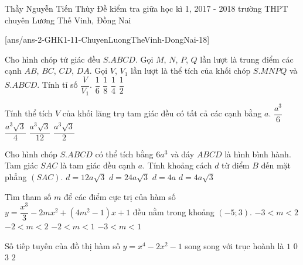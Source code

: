 
\begin{name}
{Thầy Nguyễn Tiến Thùy}
{Đề kiểm tra giữa học kì 1, 2017 - 2018 trường THPT chuyên Lương Thế Vinh, Đồng Nai}
\end{name}
\setcounter{ex}{0}
[ans/ans-2-GHK1-11-ChuyenLuongTheVinh-DongNai-18]
\begin{ex}%
Cho hình chóp tứ giác đều $S.ABCD$. Gọi $M$, $N$, $P$, $Q$ lần lượt là trung điểm các cạnh $AB$, $BC$, $CD$, $DA$. Gọi $V$, $V_1$ lần lượt là thể tích của khối chóp $S.MNPQ$ và $S.ABCD$. Tính tỉ số $\dfrac{V}{V_1}$.
\choice
{$\dfrac{1}{6}$}
{$\dfrac{1}{8}$}
{$\dfrac{1}{4}$}
{\True $\dfrac{1}{2}$}
\loigiai{
}
\end{ex}

\begin{ex}%
Tính thể tích $V$ của khối lăng trụ tam giác đều có tất cả các cạnh bằng $a$.
\choice
{$\dfrac{a^3}{6}$}
{\True $\dfrac{a^3\sqrt{3}}{4}$}
{$\dfrac{a^3\sqrt{3}}{12}$}
{$\dfrac{a^3\sqrt{3}}{2}$}
\loigiai{
}
\end{ex}

\begin{ex}%
Cho hình chóp $S.ABCD$ có thể tích bằng $6a^3$ và đáy $ABCD$ là hình bình hành. Tam giác $SAC$ là tam giác đều cạnh $a$. Tính khoảng cách $d$ từ điểm $B$ đến mặt phẳng $(SAC)$.
\choice
{\True $d=12a\sqrt{3}$}
{$d=24a\sqrt{3}$}
{$d=4a$}
{$d=4a\sqrt{3}$}
\end{ex}

\begin{ex}%
Tìm tham số $m$ để các điểm cực trị của hàm số $y=\dfrac{x^3}{3}-2mx^2+(4m^2-1)x+1$ đều nằm trong khoảng $(-5;3)$.
\choice
{$-3<m<2$}
{$-2<m<2$}
{\True $-2<m<1$}
{$-3<m<1$}
\end{ex}

\begin{ex}%
Số tiếp tuyến của đồ thị hàm số $y=x^4-2x^2-1$ song song với trục hoành là
\choice
{$1$}
{$0$}
{$3$}
{\True $2$}
\end{ex} 

